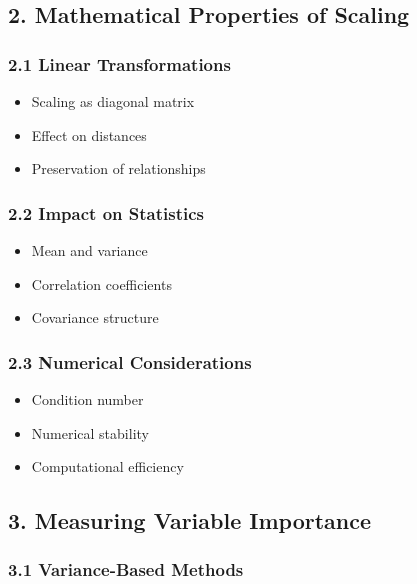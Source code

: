 \documentclass[11pt]{article}
\providecommand{\tightlist}{%
  \setlength{\itemsep}{0pt}\setlength{\parskip}{0pt}}
\begin{document}
\subsection{2. Mathematical Properties of
Scaling}\label{mathematical-properties-of-scaling}

\subsubsection{2.1 Linear Transformations}\label{linear-transformations}

\begin{itemize}
\tightlist
\item
  Scaling as diagonal matrix
\item
  Effect on distances
\item
  Preservation of relationships
\end{itemize}

\subsubsection{2.2 Impact on Statistics}\label{impact-on-statistics}

\begin{itemize}
\tightlist
\item
  Mean and variance
\item
  Correlation coefficients
\item
  Covariance structure
\end{itemize}

\subsubsection{2.3 Numerical
Considerations}\label{numerical-considerations}

\begin{itemize}
\tightlist
\item
  Condition number
\item
  Numerical stability
\item
  Computational efficiency
\end{itemize}

\subsection{3. Measuring Variable
Importance}\label{measuring-variable-importance}

\subsubsection{3.1 Variance-Based Methods}\label{variance-based-methods}
\end{document}
